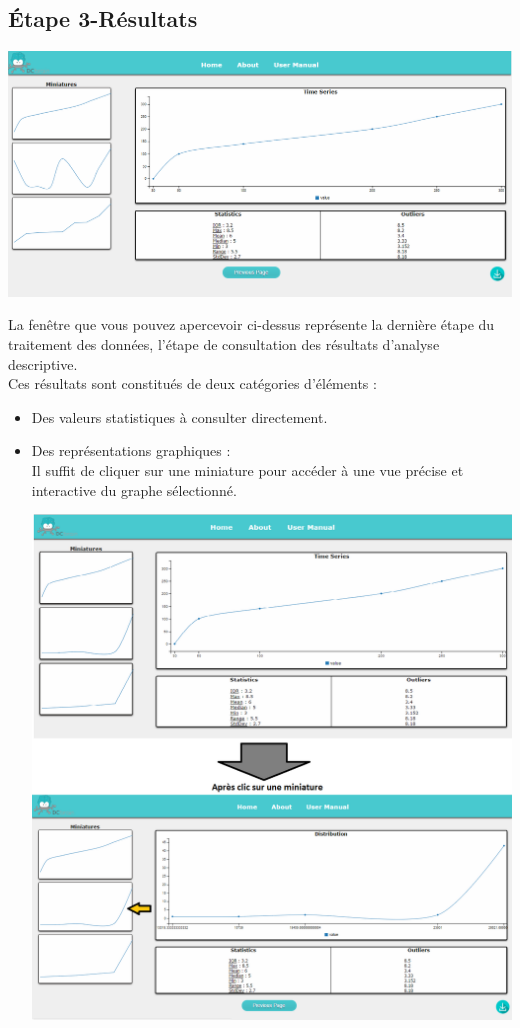 	\subsection{Étape 3-Résultats}
			\begin{center}\includegraphics[scale=0.45]{fenetre3.png}\end{center}
			
		La fenêtre que vous pouvez apercevoir ci-dessus représente la dernière étape du traitement des données, l'étape de consultation des résultats d'analyse descriptive.\\
		Ces résultats sont constitués de deux catégories d'éléments :
		\begin{itemize}
			\item Des valeurs statistiques à consulter directement.
			\item Des représentations graphiques :\\
				Il suffit de cliquer sur une miniature pour accéder à une vue précise et interactive du graphe sélectionné.\\
			\begin{center}\includegraphics[scale=0.40]{fenetre3-2.png}\end{center}		
		\end{itemize}
		
